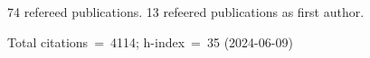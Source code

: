 74 refereed publications. 13 refeered publications as first author.

Total citations~=~4114; h-index~=~35 (2024-06-09)